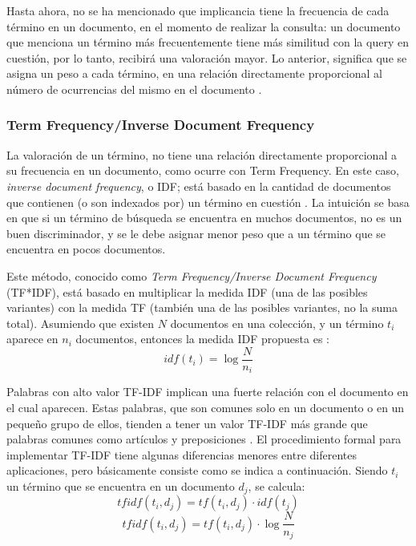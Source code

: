 \bigskip Hasta ahora, no se ha mencionado que implicancia tiene la frecuencia de cada término en un documento, en el momento de realizar la consulta: un documento que menciona un término más frecuentemente tiene más similitud con la query en cuestión, por lo tanto, recibirá una valoración mayor. Lo anterior, significa que se asigna un peso a cada término, en una relación directamente proporcional al número de ocurrencias del mismo en el documento \citep{christopher2008introduction}.


\subsubsection{Term Frequency/Inverse Document Frequency}
La valoración de un término, no tiene una relación directamente proporcional a su frecuencia en un documento, como ocurre con Term Frequency. En este caso, \textit{inverse document frequency}, o IDF; está basado en la cantidad de documentos que contienen (o son indexados por) un término en cuestión \citep{robertson2004understanding}. La intuición se basa en que si un término de búsqueda se encuentra en muchos documentos, no es un buen discriminador, y se le debe asignar menor peso que a un término que se encuentra en pocos documentos.

\bigskip Este método, conocido como \textit{Term Frequency/Inverse Document Frequency} (TF*IDF), está basado en multiplicar la medida IDF (una de las posibles variantes) con la medida TF (también una de las posibles variantes, no la suma total). Asumiendo que existen \(N\) documentos en una colección, y un término \(t_i\) aparece en \(n_i\) documentos, entonces la medida IDF propuesta es \citep{sparck1972statistical}:
\[idf(t_i) = \log{\frac{N}{n_i}}\]

\bigskip Palabras con alto valor TF-IDF implican una fuerte relación con el documento en el cual aparecen. Estas palabras, que son comunes solo en un documento o en un pequeño grupo de ellos, tienden a tener un valor TF-IDF más grande que palabras comunes como artículos y preposiciones \citep{ramos2003using}.
\bigskip El procedimiento formal para implementar TF-IDF tiene algunas diferencias menores entre diferentes aplicaciones, pero básicamente consiste como se indica a continuación. Siendo \(t_i\) un término que se encuentra en un documento \(d_j\), se calcula:
\[tfidf(t_i, d_j) = tf(t_i, d_j) \cdot idf(t_j)\]
\[tfidf(t_i, d_j) = tf(t_i, d_j) \cdot \log{\frac{N}{n_j}}\]

